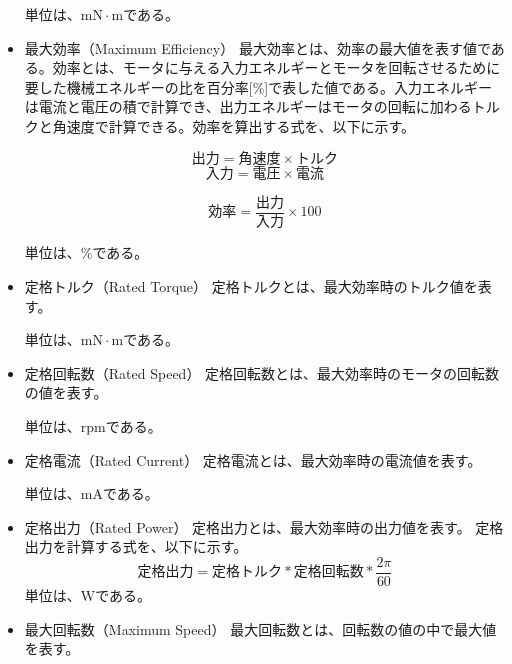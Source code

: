 \documentclass[uplatex, 10pt, a4p]{jsarticle}
\begin{document}
\begin{itemize}
単位は、$\mathrm{mN \cdot m}$である。

\item{最大効率（Maximum Efficiency）}\label{sub:sub:saidaikouritu}
最大効率とは、効率の最大値を表す値である。効率とは、モータに与える入力エネルギーとモータを回転させるために要した機械エネルギーの比を百分率[\%]で表した値である。入力エネルギーは電流と電圧の積で計算でき、出力エネルギーはモータの回転に加わるトルクと角速度で計算できる。効率を算出する式を、以下に示す。

\[
    \mbox{出力} = \mbox{角速度} \times \mbox{トルク}
\]
\[
    \mbox{入力} = \mbox{電圧} \times \mbox{電流}
\]

\[
    \mbox{効率} = \frac{\mbox{出力}}{\mbox{入力}}  \times 100
\]

単位は、$\mathrm{\%}$である。
\item{定格トルク（Rated Torque）}\label{sub:sub:teikakutoruku}
定格トルクとは、最大効率時のトルク値を表す。

単位は、$\mathrm{mN \cdot m}$である。
\item{定格回転数（Rated Speed）}\label{sub:sub:teikakukaiten}
定格回転数とは、最大効率時のモータの回転数の値を表す。

単位は、$\mathrm{rpm}$である。

\item{定格電流（Rated Current）}\label{sub:sub:teikakuden}
定格電流とは、最大効率時の電流値を表す。

単位は、$\mathrm{mA}$である。
\item{定格出力（Rated Power）}\label{sub:sub:teikakusyutu}
定格出力とは、最大効率時の出力値を表す。
定格出力を計算する式を、以下に示す。
\[  \mbox{定格出力} = \mbox{定格トルク} * \mbox{定格回転数} * \frac{2\pi}{60}　\]
単位は、$\mathrm{W}$である。
\item{最大回転数（Maximum Speed）}\label{sub:sub:saidaikai}
最大回転数とは、回転数の値の中で最大値を表す。

\end{itemize}
\end{document}
